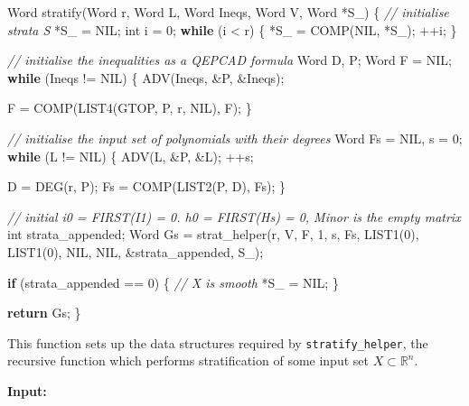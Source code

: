 \documentclass[
]{book}
\newenvironment{Shaded}{\begin{snugshade}}{\end{snugshade}}
\newcommand{\CommentTok}[1]{\textcolor[rgb]{0.56,0.35,0.01}{\textit{#1}}}
\newcommand{\ControlFlowTok}[1]{\textcolor[rgb]{0.13,0.29,0.53}{\textbf{#1}}}
\newcommand{\DataTypeTok}[1]{\textcolor[rgb]{0.13,0.29,0.53}{#1}}
\newcommand{\DecValTok}[1]{\textcolor[rgb]{0.00,0.00,0.81}{#1}}
\newcommand{\NormalTok}[1]{#1}
\theoremstyle{definition}
\theoremstyle{definition}
\theoremstyle{definition}
\theoremstyle{definition}
\theoremstyle{remark}
\begin{document}
\begin{Shaded}
\begin{Highlighting}[numbers=left,,]
\NormalTok{Word stratify(Word r, Word L, Word Ineqs, Word V, Word *S\_)}
\NormalTok{\{}
    \CommentTok{// initialise strata S}
\NormalTok{    *S\_ = NIL;}
    \DataTypeTok{int}\NormalTok{ i = }\DecValTok{0}\NormalTok{;}
    \ControlFlowTok{while}\NormalTok{ (i \textless{} r) \{}
\NormalTok{        *S\_ = COMP(NIL, *S\_);}
\NormalTok{        ++i;}
\NormalTok{    \}}

    \CommentTok{// initialise the inequalities as a QEPCAD formula}
\NormalTok{    Word D, P;}
\NormalTok{    Word F = NIL;}
    \ControlFlowTok{while}\NormalTok{ (Ineqs != NIL) \{}
\NormalTok{        ADV(Ineqs, \&P, \&Ineqs);}

\NormalTok{        F = COMP(LIST4(GTOP, P, r, NIL), F);}
\NormalTok{    \}}

    \CommentTok{// initialise the input set of polynomials with their degrees}
\NormalTok{    Word Fs = NIL, s = }\DecValTok{0}\NormalTok{;}
    \ControlFlowTok{while}\NormalTok{ (L != NIL) \{}
\NormalTok{        ADV(L, \&P, \&L);}
\NormalTok{        ++s;}

\NormalTok{        D = DEG(r, P);}
\NormalTok{        Fs = COMP(LIST2(P, D), Fs);}
\NormalTok{    \}}

    \CommentTok{// initial i0 = FIRST(I1) = 0. h0 = FIRST(Hs) = 0, Minor is the empty matrix}
    \DataTypeTok{int}\NormalTok{ strata\_appended;}
\NormalTok{    Word Gs = strat\_helper(r, V, F, }\DecValTok{1}\NormalTok{, s, Fs, LIST1(}\DecValTok{0}\NormalTok{), LIST1(}\DecValTok{0}\NormalTok{), NIL, NIL, \&strata\_appended, S\_);}

    \ControlFlowTok{if}\NormalTok{ (strata\_appended == }\DecValTok{0}\NormalTok{) \{}
        \CommentTok{// X is smooth}
\NormalTok{        *S\_ = NIL;}
\NormalTok{    \}}

    \ControlFlowTok{return}\NormalTok{ Gs;}
\NormalTok{\}}
\end{Highlighting}
\end{Shaded}

This function sets up the data structures required by \texttt{stratify\_helper}, the recursive function which performs stratification of some input set \(X \subset \mathbb{R}^n\).

\textbf{Input:}
\end{document}
